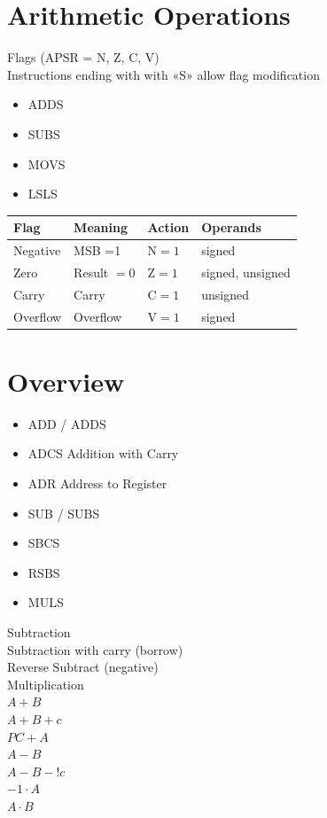 \documentclass[10pt]{article}
\begin{document}
\section*{Arithmetic Operations}
Flags (APSR = N, Z, C, V)\\
Instructions ending with with «S» allow flag modification

\begin{itemize}
  \item ADDS
  \item SUBS
  \item MOVS
  \item LSLS
\end{itemize}

\begin{center}
\begin{tabular}{|llll|}
\hline
Flag & Meaning & Action & Operands \\
\hline
Negative & MSB =1 & $\mathrm{N}=1$ & signed \\
Zero & Result $=0$ & $\mathrm{Z}=1$ & signed, unsigned \\
Carry & Carry & $\mathrm{C}=1$ & unsigned \\
Overflow & Overflow & $\mathrm{V}=1$ & signed \\
\hline
\end{tabular}
\end{center}

\section*{Overview}
\begin{itemize}
  \item ADD / ADDS
  \item ADCS Addition with Carry
  \item ADR Address to Register
  \item SUB / SUBS
  \item SBCS
  \item RSBS
  \item MULS
\end{itemize}

Subtraction\\
Subtraction with carry (borrow)\\
Reverse Subtract (negative)\\
Multiplication\\
$A+B$\\
$A+B+c$\\
$P C+A$\\
$A-B$\\
$A-B-!c$\\
$-1 \cdot A$\\
$A \cdot B$
\end{document}

